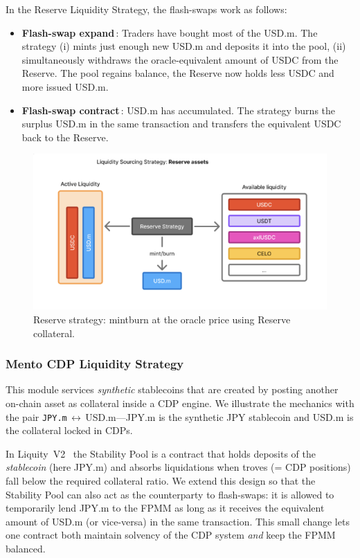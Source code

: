 \documentclass[a4paper]{article}
\providecommand{\hyp}{-}
\theoremstyle{definition}
\begin{document}
In the Reserve Liquidity Strategy, the flash\hyp swaps work as follows:
\begin{itemize}
  \item \textbf{Flash\hyp swap expand}\,: Traders have bought most of the USD.m.
        The strategy (i) mints just enough new USD.m and deposits it into the
        pool, (ii) simultaneously withdraws the oracle\hyp equivalent amount of
        USDC from the Reserve.  The pool regains balance, the Reserve now holds
        less USDC and more issued USD.m.
  \item \textbf{Flash\hyp swap contract}\,: USD.m has accumulated.  The strategy
        burns the surplus USD.m in the same transaction and transfers the
        equivalent USDC back to the Reserve.
\end{itemize}
\begin{figure}[ht]
    \centering
    \includegraphics[width=0.6\linewidth]{figures/fpmm_3.png}
    \caption{Reserve strategy: mint\/burn at the oracle price using Reserve collateral.}
\end{figure}

\subsubsection{Mento CDP Liquidity Strategy}\label{str:cdp}
This module services \emph{synthetic} stablecoins that
are created by posting another on-chain asset as collateral inside a CDP
engine.  We illustrate the mechanics with the pair
\texttt{JPY.m}\,$\leftrightarrow$\,USD.m—JPY.m is the synthetic JPY stablecoin
and USD.m is the collateral locked in CDPs.

In Liquity~V2~\cite{liquity_v2} the Stability Pool is a
contract that holds deposits of the \emph{stablecoin} (here JPY.m) and absorbs
liquidations when troves (= CDP positions) fall below the required collateral ratio.  We extend
this design so that the Stability Pool can also act as the counterparty to
flash-swaps: it is allowed to temporarily lend JPY.m to the FPMM as long as it
receives the equivalent amount of USD.m (or vice-versa) in the same
transaction.  This small change lets one contract both maintain solvency of the
CDP system \emph{and} keep the FPMM balanced.\\
\end{document}
